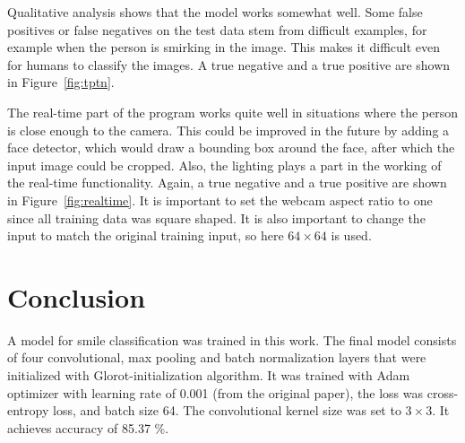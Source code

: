\documentclass{article}
\begin{document}
Qualitative analysis shows that the model works somewhat well. Some
false positives or false negatives on the test data stem from
difficult examples, for example when the person is smirking in the
image. This makes it difficult even for humans to classify the images.
A true negative and a true positive are shown in
Figure~\ref{fig:tptn}.

The real-time part of the program works quite well in situations where
the person is close enough to the camera. This could be improved in
the future by adding a face detector, which would draw a bounding box
around the face, after which the input image could be cropped. Also,
the lighting plays a part in the working of the real-time
functionality. Again, a true negative and a true positive are shown in
Figure~\ref{fig:realtime}. It is important to set the webcam aspect
ratio to one since all training data was square shaped. It is also
important to change the input to match the original training input, so
here $64 \times 64$ is used.


\section{Conclusion}\label{sec:conclusion}
A model for smile classification was trained in this work. The final
model consists of four convolutional, max pooling and batch
normalization layers that were initialized with Glorot-initialization
algorithm. It was trained with Adam optimizer with learning rate of
0.001 (from the original paper), the loss was cross-entropy loss, and
batch size 64. The convolutional kernel size was set to $3 \times 3$.
It achieves accuracy of 85.37 \%.

\small






\vfill\pagebreak
\end{document}

